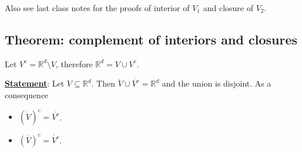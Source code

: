 \documentclass[10pt]{extarticle}
\newcommand{\R}{\mathbb{R}}
\begin{document}
                Also see last class notes for the proofs of interior of $V_1$ and closure of $V_2$.

                \subsection{Theorem: complement of interiors and closures}

                Let $V^c = \R^d \setminus V$, therefore $\R^d = V \cup V^c$.

                \textbf{\underline{Statement}}: Let $V \subseteq \R^d$.
                Then $\mathring{V} \cup \overline{V^c} = \R^d$ and the union is disjoint.
                As a consequence
                \begin{itemize}
                    \item $\left(\mathring{V}\right)^c = \overline{V^c}$.
                    \item $\left(\overline{V}\right)^c = \mathring{V^c}$.
                \end{itemize}
\end{document}
